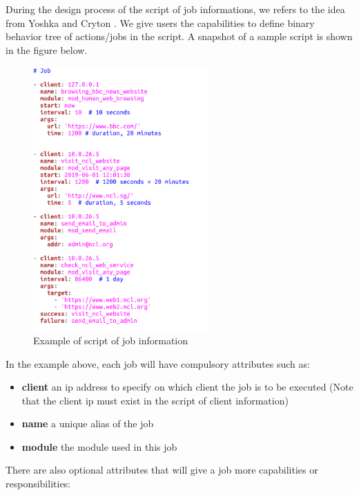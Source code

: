 \documentclass[12pt]{report}
\begin{document}
During the design process of the script of job informations, we refers to the idea from Yoshka \cite{Yoshka} and Cryton \citep{Cryton}. We give users the capabilities to define binary behavior tree of actions/jobs in the script. A snapshot of a sample script is shown in the figure below.\\

\begin{figure}[h!]
	\centering
	\includegraphics[width=0.6\textwidth]{./pictures/job-template}
	\caption{Example of script of job information}
\end{figure}

In the example above, each job will have compulsory attributes such as:

\begin{itemize}
\item \textbf{client} an ip address to specify on which client the job is to be executed (Note that the client ip must exist in the script of client information)
\item \textbf{name} a unique alias of the job
\item \textbf{module} the module used in this job
\end{itemize}

There are also optional attributes that will give a job more capabilities or responsibilities:
\end{document}
